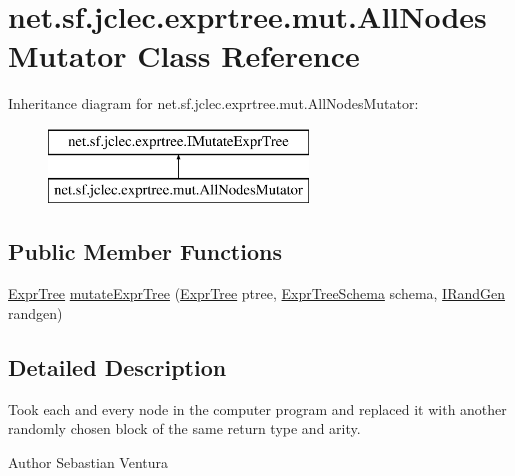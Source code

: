 \hypertarget{classnet_1_1sf_1_1jclec_1_1exprtree_1_1mut_1_1_all_nodes_mutator}{\section{net.\-sf.\-jclec.\-exprtree.\-mut.\-All\-Nodes\-Mutator Class Reference}
\label{classnet_1_1sf_1_1jclec_1_1exprtree_1_1mut_1_1_all_nodes_mutator}
}
Inheritance diagram for net.\-sf.\-jclec.\-exprtree.\-mut.\-All\-Nodes\-Mutator\-:\begin{figure}[H]
\begin{center}
\leavevmode
\includegraphics[height=2.000000cm]{classnet_1_1sf_1_1jclec_1_1exprtree_1_1mut_1_1_all_nodes_mutator}
\end{center}
\end{figure}
\subsection*{Public Member Functions}
\begin{DoxyCompactItemize}
\item 
\hyperlink{classnet_1_1sf_1_1jclec_1_1exprtree_1_1_expr_tree}{Expr\-Tree} \hyperlink{classnet_1_1sf_1_1jclec_1_1exprtree_1_1mut_1_1_all_nodes_mutator_a7e052b0f77eb63ad293f359dee697fc6}{mutate\-Expr\-Tree} (\hyperlink{classnet_1_1sf_1_1jclec_1_1exprtree_1_1_expr_tree}{Expr\-Tree} ptree, \hyperlink{classnet_1_1sf_1_1jclec_1_1exprtree_1_1_expr_tree_schema}{Expr\-Tree\-Schema} schema, \hyperlink{interfacenet_1_1sf_1_1jclec_1_1util_1_1random_1_1_i_rand_gen}{I\-Rand\-Gen} randgen)
\end{DoxyCompactItemize}


\subsection{Detailed Description}
Took each and every node in the computer program and replaced it with another randomly chosen block of the same return type and arity.

\begin{DoxyAuthor}{Author}
Sebastian Ventura 
\end{DoxyAuthor}


